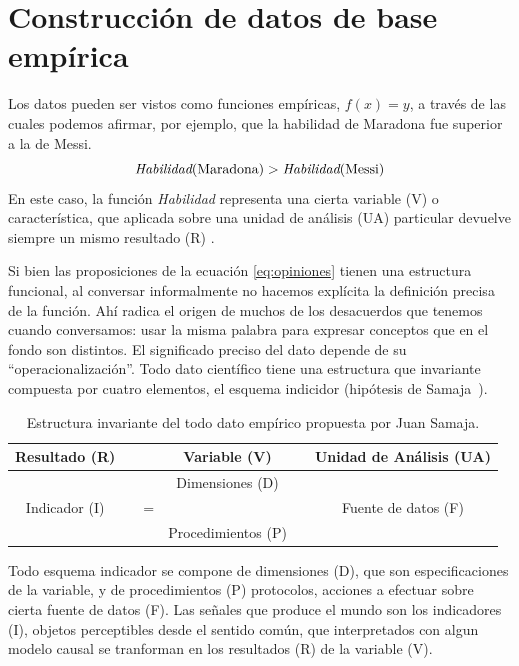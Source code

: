\documentclass[a4paper,10pt]{book}
\theoremstyle{definition}
\begin{document}
\section{Construcci\'on de datos de base empírica} \label{sec:base_empirica_metodo}

Los datos pueden ser vistos como funciones emp\'iricas, $f(x)=y$, a trav\'es de las cuales podemos afirmar, por ejemplo, que la habilidad de Maradona fue superior a la de Messi.
\begin{equation}\label{eq:opiniones}
 \emph{Habilidad}(\text{Maradona}) > \emph{Habilidad}(\text{Messi})
\end{equation}
En este caso, la funci\'on \emph{Habilidad} representa una cierta variable (V) o caracter\'istica, que aplicada sobre una unidad de an\'alisis (UA) particular devuelve siempre un mismo resultado (R) .


Si bien las proposiciones de la ecuaci\'on \ref{eq:opiniones} tienen una estructura funcional, al conversar informalmente no hacemos explícita la definici\'on precisa de la funci\'on.
Ahí radica el origen de muchos de los desacuerdos que tenemos cuando conversamos: usar la misma palabra para expresar conceptos que en el fondo son distintos.
El significado preciso del dato depende de su ``operacionalizaci\'on''.
Todo dato científico tiene una estructura que invariante compuesta por cuatro elementos, el esquema indicidor (hipótesis de Samaja~\cite{}).

\begin{table}[ht!]
\centering
\begin{tabular}{clcccc}
Resultado (R) & \multicolumn{1}{r|}{} &  & Variable (V) &  &  \multicolumn{1}{|c}{Unidad de An\'alisis (UA)} \\ \hline
   &  \multicolumn{1}{r|}{}    &  & Dimensiones (D) &  & \multicolumn{1}{|r}{} \\
                 Indicador (I)  &   & =  &  &  &  Fuente de datos (F) \\
 & \multicolumn{1}{r|}{} &  & Procedimientos (P) &        &    \multicolumn{1}{|r}{}  
\end{tabular}
\caption{Estructura invariante del todo dato emp\'irico propuesta por Juan Samaja.}
\label{tab:matriz_datos}
\end{table}


Todo esquema indicador se compone de dimensiones (D), que son especificaciones de la variable, y de procedimientos (P) protocolos, acciones a efectuar sobre cierta fuente de datos (F).
Las señales que produce el mundo son los indicadores (I), objetos perceptibles desde el sentido común, que interpretados con algun modelo causal se tranforman en los resultados (R) de la variable (V).
\end{document}
